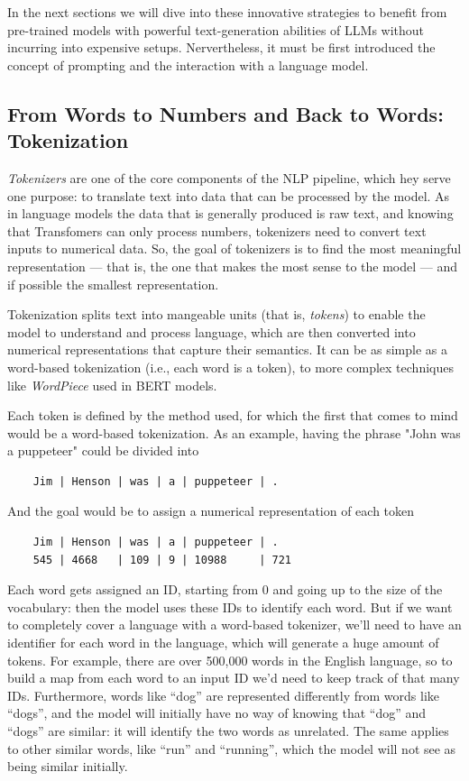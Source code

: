 In the next sections we will dive into these innovative strategies to benefit from pre-trained models with powerful text-generation abilities of LLMs without incurring into expensive setups. Nervertheless, it must be first introduced the concept of prompting and the interaction with a language model.


\subsection{From Words to Numbers and Back to Words: Tokenization}
\label{sec:tokenization}

\textit{Tokenizers} are one of the core components of the NLP pipeline, which hey serve one purpose: to translate text into data that can be processed by the model. As in language models the data that is generally produced is raw text, and knowing that Transfomers can only process numbers, tokenizers need to convert text inputs to numerical data. So, the goal of tokenizers is to find the most meaningful representation — that is, the one that makes the most sense to the model — and if possible the smallest representation.

Tokenization splits text into mangeable units (that is, \textit{tokens}) to enable the model to understand and process language, which are then converted into numerical representations that capture their semantics. It can be as simple as a word-based tokenization (i.e., each word is a token), to more complex techniques like \textit{WordPiece} used in BERT models.

Each token is defined by the method used, for which the first that comes to mind would be a word-based tokenization. As an example, having the phrase "John was a puppeteer" could be divided into

\begin{verbatim}
    Jim | Henson | was | a | puppeteer | .
\end{verbatim}

And the goal would be to assign a numerical representation of each token

\begin{verbatim}
    Jim | Henson | was | a | puppeteer | .
    545 | 4668   | 109 | 9 | 10988     | 721 
\end{verbatim}

Each word gets assigned an ID, starting from 0 and going up to the size of the vocabulary: then the model uses these IDs to identify each word. But if we want to completely cover a language with a word-based tokenizer, we’ll need to have an identifier for each word in the language, which will generate a huge amount of tokens. For example, there are over 500,000 words in the English language, so to build a map from each word to an input ID we’d need to keep track of that many IDs. Furthermore, words like “dog” are represented differently from words like “dogs”, and the model will initially have no way of knowing that “dog” and “dogs” are similar: it will identify the two words as unrelated. The same applies to other similar words, like “run” and “running”, which the model will not see as being similar initially.\cite{huggingfacecourse}

